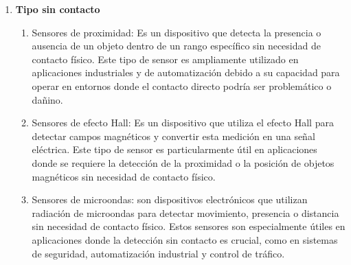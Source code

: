 \begin{enumerate}
\begin{enumerate}
			\begin{figure}[h]
				\centering
				\hfill
			\end{figure}
			
		\end{enumerate}
		\item \textbf{Tipo sin contacto}
		\begin{enumerate}
			\item Sensores de proximidad:  Es un dispositivo que detecta la presencia o ausencia de un objeto dentro de un rango específico sin necesidad de contacto físico. Este tipo de sensor es ampliamente utilizado en aplicaciones industriales y de automatización debido a su capacidad para operar en entornos donde el contacto directo podría ser problemático o dañino.\cite{Prox}\\ 
			\begin{figure}[h]
				\centering
				\hfill
			\end{figure}
			\item Sensores de efecto Hall: Es un dispositivo que utiliza el efecto Hall para detectar campos magnéticos y convertir esta medición en una señal eléctrica. Este tipo de sensor es particularmente útil en aplicaciones donde se requiere la detección de la proximidad o la posición de objetos magnéticos sin necesidad de contacto físico.\cite{EHall}\\ 
			\begin{figure}[h]
				\centering
				\hfill
			\end{figure}
			\item Sensores de microondas: son dispositivos electrónicos que utilizan radiación de microondas para detectar movimiento, presencia o distancia sin necesidad de contacto físico. Estos sensores son especialmente útiles en aplicaciones donde la detección sin contacto es crucial, como en sistemas de seguridad, automatización industrial y control de tráfico.\cite{microo}\\ 
			\begin{figure}[h]
				\centering
\end{figure}
\end{enumerate}
\end{enumerate}
